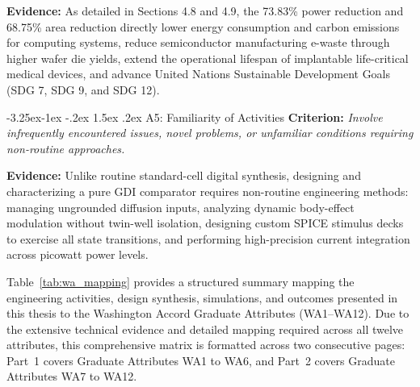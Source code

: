 \documentclass[12pt,a4paper,oneside]{report}
\makeatletter
\renewcommand\subsubsection{\@startsection{subsubsection}{3}{\z@}%
                                     {-3.25ex\@plus -1ex \@minus -.2ex}%
                                     {1.5ex \@plus .2ex}%
                                     {\normalfont\normalsize\itshape}}
\makeatother
\begin{document}
\noindent\textbf{Evidence:} As detailed in Sections 4.8 and 4.9, the 73.83\% power reduction and 68.75\% area reduction directly lower energy consumption and carbon emissions for computing systems, reduce semiconductor manufacturing e-waste through higher wafer die yields, extend the operational lifespan of implantable life-critical medical devices, and advance United Nations Sustainable Development Goals (SDG 7, SDG 9, and SDG 12).

\subsubsection{A5: Familiarity of Activities}
\textbf{Criterion:} \textit{Involve infrequently encountered issues, novel problems, or unfamiliar conditions requiring non-routine approaches.}

\noindent\textbf{Evidence:} Unlike routine standard-cell digital synthesis, designing and characterizing a pure GDI comparator requires non-routine engineering methods: managing ungrounded diffusion inputs, analyzing dynamic body-effect modulation without twin-well isolation, designing custom SPICE stimulus decks to exercise all state transitions, and performing high-precision current integration across picowatt power levels.

Table~\ref{tab:wa_mapping} provides a structured summary mapping the engineering activities, design synthesis, simulations, and outcomes presented in this thesis to the Washington Accord Graduate Attributes (WA1--WA12). Due to the extensive technical evidence and detailed mapping required across all twelve attributes, this comprehensive matrix is formatted across two consecutive pages: Part~1 covers Graduate Attributes WA1 to WA6, and Part~2 covers Graduate Attributes WA7 to WA12.

\clearpage
\end{document}
